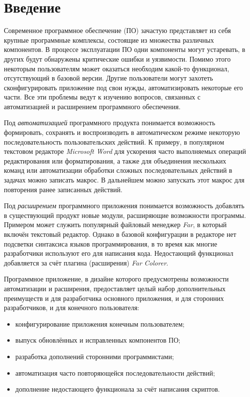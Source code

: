 \setcounter{secnumdepth}{0} %
\section{Введение}
\setcounter{secnumdepth}{2}

Современное программное обеспечение (ПО) зачастую представляет из себя крупные программные комплексы, состоящие из множества различных компонентов. В процессе эксплуатации ПО одни компоненты могут устаревать, в других будут обнаружены критические ошибки и уязвимости. Помимо этого некоторым пользователям может оказаться необходим какой-то функционал, отсутствующий в базовой версии. Другие пользователи могут захотеть сконфигурировать приложение под свои нужды, автоматизировать некоторые его части. Все эти проблемы ведут к изучению вопросов, связанных с автоматизацией и расширением программного обеспечения.

Под {\it автоматизацией} программного продукта понимается возможность формировать, сохранять и воспроизводить в автоматическом режиме некоторую последовательность пользовательских действий. К примеру, в популярном текстовом редакторе {\it Microsoft Word} для ускорения часто выполняемых операций редактирования или форматирования, а также для объединения нескольких команд или автоматизации обработки сложных последовательных действий в задачах можно записать макрос. В дальнейшем можно запускать этот макрос для повторения ранее записанных действий.

Под {\it расширением} программного приложения понимается возможность добавлять в существующий продукт новые модули, расширяющие возможности программы. Примером может служить популярный файловый менеджер {\it Far}, в который включён текстовый редактор. Однако в базовой конфигурации в редакторе нет подсветки синтаксиса языков программирования, в то время как многие разработчики используют его для написания кода. Недостающий функционал добавляется за счёт плагина (расширения) {\it Far Colorer}. 

Программное приложение, в дизайне которого предусмотрены возможности автоматизации и расширения, предоставляет целый набор дополнительных преимуществ и для разработчика основного приложения, и для сторонних разработчиков, и для конечного пользователя:
\begin{itemize}
\item конфигурирование приложения конечным пользователем;
\item выпуск обновлённых и исправленных компонентов ПО;
\item разработка дополнений сторонними программистами;
\item автоматизация часто повторяющейся последовательности действий;
\item дополнение недостающего функционала за счёт написания скриптов.
\end{itemize}


